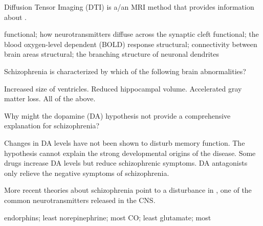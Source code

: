 \documentclass[answers]{exam}
\begin{document}
\begin{questions}
\question Diffusion Tensor Imaging (DTI) is a/an \fillin MRI method that provides information about \fillin.
\begin{choices}
\choice functional; how neurotransmitters diffuse across the synaptic cleft
\choice functional; the blood oxygen-level dependent (BOLD) response
\correctchoice structural; connectivity between brain areas
\choice structural; the branching structure of neuronal dendrites
\end{choices}


\question Schizophrenia is characterized by which of the following brain abnormalities?
\begin{choices}
\choice Increased size of ventricles.
\choice Reduced hippocampal volume.
\choice Accelerated gray matter loss.
\correctchoice All of the above.
\end{choices}

\question Why might the dopamine (DA) hypothesis not provide a comprehensive explanation for schizophrenia?
\begin{choices}
\choice Changes in DA levels have not been shown to disturb memory function.
\choice The hypothesis cannot explain the strong developmental origins of the disease.
\correctchoice Some drugs increase DA levels but reduce schizophrenic symptoms.
\choice DA antagonists only relieve the negative symptoms of schizophrenia.
\end{choices}

\question More recent theories about schizophrenia point to a disturbance in \fillin, one of the \fillin common neurotransmitters released in the CNS.
\begin{choices}
\choice endorphins; least
\choice norepinephrine; most
\choice CO; least
\correctchoice glutamate; most
\end{choices}



\end{questions}
\end{document}
